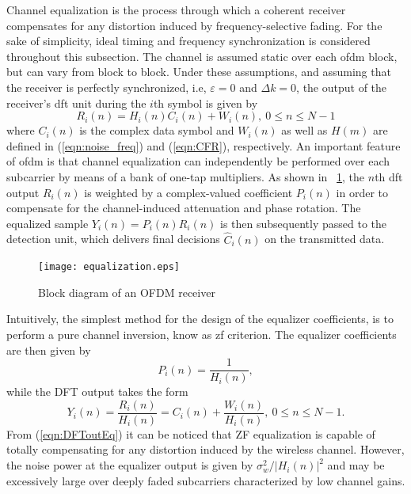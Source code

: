Channel equalization is the process through which a coherent receiver compensates for any distortion induced by frequency-selective fading. For the sake of simplicity, ideal timing and frequency synchronization is considered throughout this subsection. The channel is assumed static over each \gls{ofdm} block, but can vary from block to block. Under these assumptions, and assuming that the receiver is perfectly synchronized, i.e, $\varepsilon = 0$ and $\Delta k = 0$, the output of the receiver's \gls{dft} unit during the $i$th symbol is given by
%
\begin{equation}
\label{eqn:DFTout}
 R_i(n)=H_i(n)C_i(n) + W_i(n),\ 0\leq n \leq N-1
\end{equation}
%
where $C_i(n)$ is the complex data symbol and $W_i(n)$ as well as $H(m)$ are defined in (\ref{eqn:noise_freq}) and (\ref{eqn:CFR}), respectively. An important feature of \gls{ofdm} is that channel equalization can independently be performed over each subcarrier by means of a bank of one-tap multipliers. As shown in ~\cref{fig:equalization}, the $n$th \gls{dft} output $R_i(n)$ is weighted by a complex-valued coefficient $P_i(n)$ in order to compensate for the channel-induced attenuation and phase rotation. The equalized sample $Y_i(n)=P_i(n)R_i(n)$ is then subsequently passed to the detection unit, which delivers final decisions $\hat{C}_i(n)$ on the transmitted data.
%
\begin{figure}[thb]
\centering
\texttt{[image: equalization.eps]}
\caption{Block diagram of an OFDM receiver\label{fig:equalization}}
\end{figure}
%
Intuitively, the simplest method for the design of the equalizer coefficients, is to perform a pure channel inversion, know as \gls{zf} criterion. The equalizer coefficients are then given by
%
\begin{equation}
\label{eqn:EqCoeff}
 P_i(n)=\frac{1}{H_i(n)},
\end{equation}
%
while the DFT output takes the form
%
\begin{equation}
\label{eqn:DFToutEq}
 Y_i(n)=\frac{R_i(n)}{H_i(n)}=C_i(n) + \frac{W_i(n)}{H_i(n)},\ 0\leq n \leq N-1.
\end{equation}
%
From (\ref{eqn:DFToutEq}) it can be noticed that ZF equalization is capable of totally compensating for any distortion induced by the wireless channel. However, the noise power at the equalizer output is given by $\sigma_w^2/|H_i(n)|^2$ and may be excessively large over deeply faded subcarriers characterized by low channel gains. 

